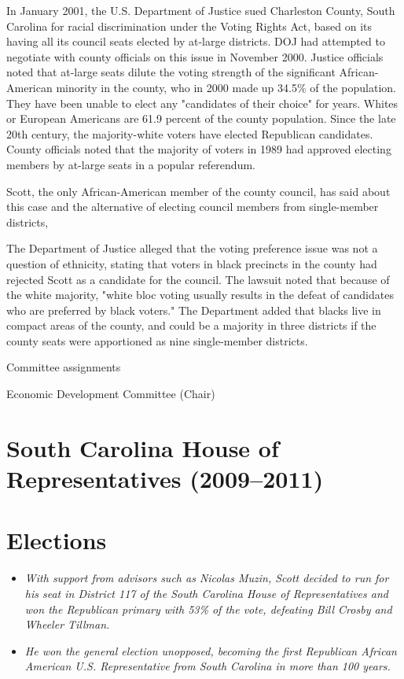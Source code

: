 In January 2001, the U.S. Department of Justice sued Charleston County,
South Carolina for racial discrimination under the Voting Rights Act,
based on its having all its council seats elected by at-large districts.
DOJ had attempted to negotiate with county officials on this issue in
November 2000. Justice officials noted that at-large seats dilute the
voting strength of the significant African-American minority in the
county, who in 2000 made up 34.5\% of the population. They have been
unable to elect any "candidates of their choice" for years. Whites or
European Americans are 61.9 percent of the county population. Since the
late 20th century, the majority-white voters have elected Republican
candidates. County officials noted that the majority of voters in 1989
had approved electing members by at-large seats in a popular referendum.

Scott, the only African-American member of the county council, has said
about this case and the alternative of electing council members from
single-member districts,

The Department of Justice alleged that the voting preference issue was
not a question of ethnicity, stating that voters in black precincts in
the county had rejected Scott as a candidate for the council. The
lawsuit noted that because of the white majority, "white bloc voting
usually results in the defeat of candidates who are preferred by black
voters." The Department added that blacks live in compact areas of the
county, and could be a majority in three districts if the county seats
were apportioned as nine single-member districts.

Committee assignments

Economic Development Committee (Chair)

\section{South Carolina House of Representatives
(2009--2011)}\label{south-carolina-house-of-representatives-20092011}

\section{Elections}\label{elections-1}

\begin{itemize}
\item
  \emph{With support from advisors such as Nicolas Muzin, Scott decided
  to run for his seat in District 117 of the South Carolina House of
  Representatives and won the Republican primary with 53\% of the vote,
  defeating Bill Crosby and Wheeler Tillman.}
\item
  \emph{He won the general election unopposed, becoming the first
  Republican African American U.S. Representative from South Carolina in
  more than 100 years.}
\end{itemize}

